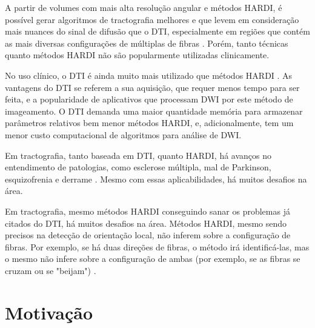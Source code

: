 \documentclass[
    12pt,                %
    oneside,            %
    a4paper,            %
    english,            %
    french,                %
    spanish,            %
    brazil                %
    ]{abntex2}
\begin{document}
A partir de volumes com mais alta resolução angular e métodos HARDI, é possível gerar algoritmos de tractografia melhores e que levem em consideração mais nuances do sinal de difusão que o DTI, especialmente em regiões que contém as mais diversas configurações de múltiplas de fibras \cite{fillard2011}. Porém, tanto técnicas quanto métodos HARDI não são popularmente utilizadas clinicamente. %

No uso clínico, o DTI é ainda muito mais utilizado que métodos HARDI \cite{descoteaux2015}. As vantagens do DTI se referem a sua aquisição, que requer menos tempo para ser feita, e a popularidade de aplicativos que processam DWI por este método de imageamento. O DTI demanda uma maior quantidade memória para armazenar parâmetros relativos bem menor métodos HARDI,  e, adicionalmente, tem um menor custo computacional de algoritmos para análise de DWI.

Em tractografia, tanto baseada em DTI, quanto HARDI, há avanços no entendimento de patologias, como esclerose múltipla, mal de Parkinson, esquizofrenia e derrame \cite{SCHILLING2019194}. Mesmo com essas aplicabilidades, há muitos desafios na área.

Em tractografia, mesmo métodos HARDI conseguindo sanar os problemas já citados do DTI, há muitos desafios na área. Métodos HARDI, mesmo sendo precisos na detecção de orientação local, não inferem sobre a configuração de fibras. Por exemplo, se há duas direções de fibras, o método irá identificá-las, mas o mesmo não infere sobre a configuração de ambas (por exemplo, se as fibras se cruzam ou se "beijam")  \cite{SCHILLING2019194}.




\section{Motivação}
\label{ssec:motivation}

\end{document}
